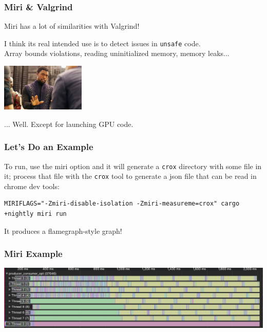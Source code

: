 \begin{frame}
\frametitle{Miri \& Valgrind}

Miri has a lot of similarities with Valgrind!

I think its real intended use is to detect issues in \texttt{unsafe} code.\\
\quad Array bounds violations, reading uninitialized memory, memory leaks...

\begin{center}
	\includegraphics[width=0.3\textwidth]{images/dothathere.jpg}
\end{center}

... Well. Except for launching GPU code.

\end{frame}

\begin{frame}[fragile]
\frametitle{Let's Do an Example}

To run, use the miri option and it will generate a \texttt{crox} directory with some file in it; process that file with the \texttt{crox} tool to generate a json file that can be read in chrome dev tools:

\begin{lstlisting}
MIRIFLAGS="-Zmiri-disable-isolation -Zmiri-measureme=crox" cargo +nightly miri run
\end{lstlisting}

It produces a flamegraph-style graph!

\end{frame}

\begin{frame}
\frametitle{Miri Example}

\begin{center}
	\includegraphics[width=\textwidth]{images/miri-pco1.png}
\end{center}

\end{frame}

